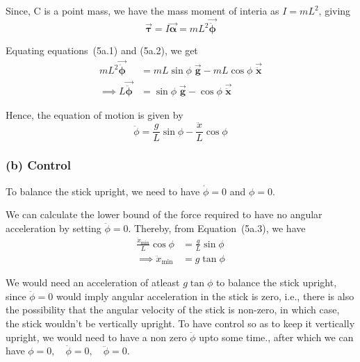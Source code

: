 Since, C is a point mass, we have the mass moment of interia as \( I = mL^2 \), giving
\begin{equation}
    \vec{\boldsymbol{\tau}} = I \vec{\boldsymbol{\alpha}} = mL^2 \vec{\ddot{\boldsymbol{\phi}}}
    \tag{5a.2}
\end{equation}

Equating equations~(5a.1) and (5a.2), we get
\begin{align*}
    mL^2 \vec{\ddot{\boldsymbol{\phi}}}
     & =
    mL\sin\phi \; \vec{\mathbf{g}} - mL\cos\phi \; \vec{\ddot{\mathbf{x}}} \\
    \implies
    L \vec{\ddot{\boldsymbol{\phi}}}
     & =
    \sin\phi \; \vec{\mathbf{g}} - \cos\phi \; \vec{\ddot{\mathbf{x}}}
\end{align*}

Hence, the equation of motion is given by
\begin{equation}
    \boxed{
        \ddot{\phi} = \frac{g}{L} \sin\phi - \frac{\ddot x}{L} \cos\phi
    }
    \tag{5a.3}
\end{equation}

\subsubsection*{(b) Control}

To balance the stick upright, we need to have \( \dot\phi = 0 \) and \( \phi = 0 \).

We can calculate the lower bound of the force required to have no angular acceleration by setting \( \ddot\phi = 0 \).
Thereby, from Equation~(5a.3), we have
\begin{align*}
    \frac{\ddot x_{\min}}{L} \cos\phi
     & =
    \frac{g}{L} \sin\phi
    \\ \implies
    \ddot x_{\min}
     & =
    g \tan\phi
\end{align*}

We would need an acceleration of atleast \( g \tan\phi \) to balance the stick upright, since \( \ddot \phi = 0\) would imply angular acceleration in the stick is zero, i.e., there is also the possibility that the angular velocity of the stick is non-zero, in which case, the stick wouldn't be vertically upright.
To have control so as to keep it vertically upright, we would need to have a non zero \( \ddot\phi \) upto some time., after which we can have \( \phi = 0, \quad \dot \phi = 0, \quad \ddot \phi = 0 \).
